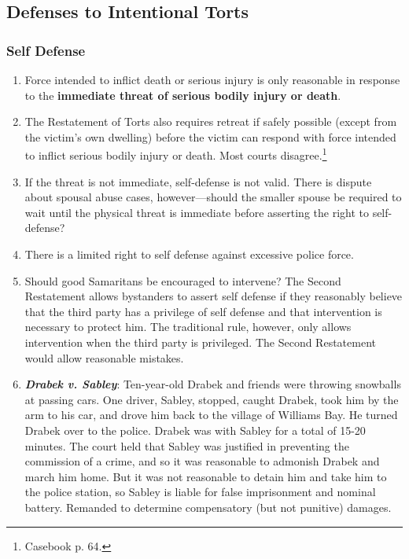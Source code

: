 \subsection{Defenses to Intentional Torts}

\subsubsection{Self Defense}

\begin{enumerate}
    \item Force intended to inflict death or serious injury is only reasonable in response to the \textbf{immediate threat of serious bodily injury or death}.
    \item The Restatement of Torts also requires retreat if safely possible (except from the victim's own dwelling) before the victim can respond with force intended to inflict serious bodily injury or death. Most courts disagree.\footnote{Casebook p. 64.}
    \item If the threat is not immediate, self-defense is not valid. There is dispute about spousal abuse cases, however---should the smaller spouse be required to wait until the physical threat is immediate before asserting the right to self-defense?
    \item There is a limited right to self defense against excessive police force.
    \item Should good Samaritans be encouraged to intervene? The Second Restatement allows bystanders to assert self defense if they reasonably believe that the third party has a privilege of self defense and that intervention is necessary to protect him. The traditional rule, however, only allows intervention when the third party is privileged. The Second Restatement would allow reasonable mistakes.
    \item \textbf{\emph{Drabek v. Sabley}}: Ten-year-old Drabek and friends were throwing snowballs at passing cars. One driver, Sabley, stopped, caught Drabek, took him by the arm to his car, and drove him back to the village of Williams Bay. He turned Drabek over to the police. Drabek was with Sabley for a total of 15-20 minutes. The court held that Sabley was justified in preventing the commission of a crime, and so it was reasonable to admonish Drabek and march him home. But it was not reasonable to detain him and take him to the police station, so Sabley is liable for false imprisonment and nominal battery. Remanded to determine compensatory (but not punitive) damages.
\end{enumerate}

